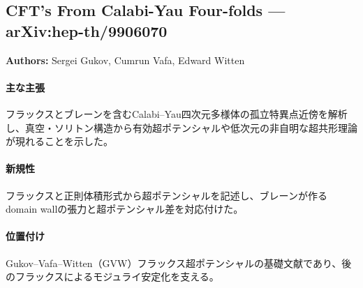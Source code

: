 \subsection{CFT's From Calabi-Yau Four-folds --- arXiv:hep-th/9906070}

\textbf{Authors:} Sergei Gukov, Cumrun Vafa, Edward Witten

\paragraph{主な主張}
フラックスとブレーンを含むCalabi--Yau四次元多様体の孤立特異点近傍を解析し、真空・ソリトン構造から有効超ポテンシャルや低次元の非自明な超共形理論が現れることを示した。 \cite{Gukov:1999ya}

\paragraph{新規性}
フラックスと正則体積形式から超ポテンシャルを記述し、ブレーンが作るdomain wallの張力と超ポテンシャル差を対応付けた。

\paragraph{位置付け}
Gukov--Vafa--Witten（GVW）フラックス超ポテンシャルの基礎文献であり、後のフラックスによるモジュライ安定化を支える。
